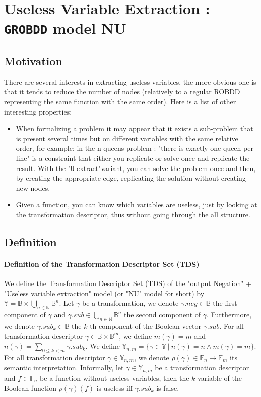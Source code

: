 \documentclass[a4paper,10pt]{article}
\newcommand{\N}{\mathbb{N}}%
\newcommand{\B}{\mathbb{B}}
\newcommand{\F}{\mathbb{F}}
\newcommand{\Y}{\mathbb{Y}}
\newcommand{\uextract}{"\texttt{U} extract"}
\newcommand{\GroBdd}{\texttt{GROBDD}}
\begin{document}
\section{Useless Variable Extraction : \GroBdd{} model NU}

\subsection{Motivation}

There are several interests in extracting useless variables, the more obvious one is that it tends to reduce the number of nodes (relatively to a regular ROBDD representing the same function with the same order).
Here is a list of other interesting properties:\begin{itemize}
\item When formalizing a problem it may appear that it exists a sub-problem that is present several times but on different variables with the same relative order, for example: in the n-queens problem : "there is exactly one queen per line" is a constraint that either you replicate or solve once and replicate the result.
With the \uextract variant, you can solve the problem once and then, by creating the appropriate edge, replicating the solution without creating new nodes.
\item Given a function, you can know which variables are useless, just by looking at the transformation descriptor, thus without going through the all structure.
\end{itemize}

\subsection{Definition}

\paragraph{Definition of the Transformation Descriptor Set (TDS)}

We define the Transformation Descriptor Set (TDS) of the "output Negation" + "Useless variable extraction" model (or "NU" model for short) by $\Y = \B \times \bigcup_{n\in\N} \B^n$.
Let $\gamma$ be a transformation, we denote $\gamma.neg \in \B$ the first component of $\gamma$ and $\gamma.sub \in \bigcup_{n\in\N} \B^n$ the second component of $\gamma$.
Furthermore, we denote $\gamma.sub_k \in\B$ the $k$-th component of the Boolean vector $\gamma.sub$.
For all transformation descriptor $\gamma \in \B \times \B^m$, we define $m(\gamma) = m$ and $n(\gamma) = \sum_{0\leq k < m} \gamma.sub_k$.
We define $\Y_{n, m} = \{\gamma\in\Y~|~n(\gamma) = n \land m(\gamma) = m\}$.
For all transformation descriptor $\gamma\in\Y_{n, m}$, we denote $\rho(\gamma) \in \F_n \rightarrow \F_m$ its semantic interpretation.
Informally, let $\gamma\in\Y_{n, m}$ be a transformation descriptor and $f\in\F_n$ be a function without useless variables, then the $k$-variable of the Boolean function $\rho(\gamma)(f)$ is useless iff $\gamma.sub_k$ is false.
\end{document}
